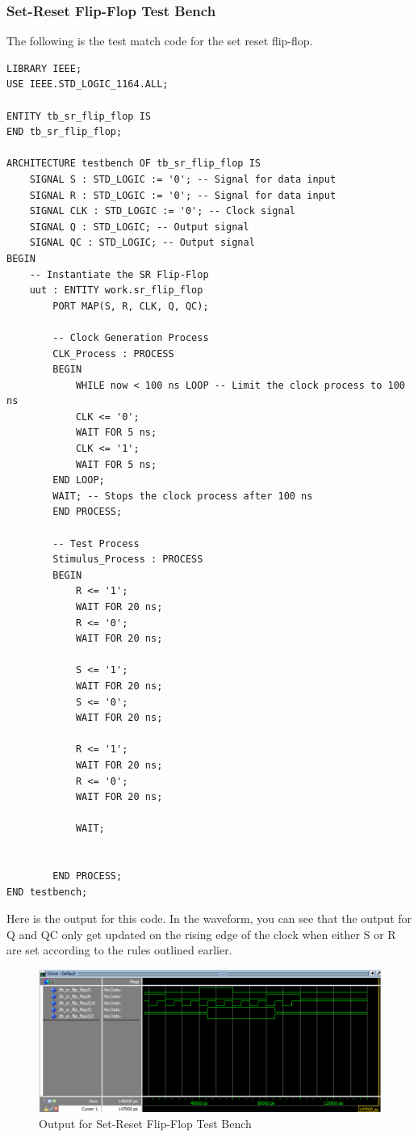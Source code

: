 \documentclass[12pt]{article}
\begin{document}
\subsubsection{Set-Reset Flip-Flop Test Bench}
The following is the test match code for the set reset flip-flop.
\begin{verbatim}
LIBRARY IEEE;
USE IEEE.STD_LOGIC_1164.ALL;

ENTITY tb_sr_flip_flop IS
END tb_sr_flip_flop;

ARCHITECTURE testbench OF tb_sr_flip_flop IS
    SIGNAL S : STD_LOGIC := '0'; -- Signal for data input
    SIGNAL R : STD_LOGIC := '0'; -- Signal for data input
    SIGNAL CLK : STD_LOGIC := '0'; -- Clock signal
    SIGNAL Q : STD_LOGIC; -- Output signal
    SIGNAL QC : STD_LOGIC; -- Output signal
BEGIN
    -- Instantiate the SR Flip-Flop
    uut : ENTITY work.sr_flip_flop
        PORT MAP(S, R, CLK, Q, QC);

        -- Clock Generation Process
        CLK_Process : PROCESS
        BEGIN
            WHILE now < 100 ns LOOP -- Limit the clock process to 100 ns
            CLK <= '0';
            WAIT FOR 5 ns;
            CLK <= '1';
            WAIT FOR 5 ns;
        END LOOP;
        WAIT; -- Stops the clock process after 100 ns
        END PROCESS;

        -- Test Process
        Stimulus_Process : PROCESS
        BEGIN
            R <= '1';
            WAIT FOR 20 ns;
            R <= '0';
            WAIT FOR 20 ns;

            S <= '1';
            WAIT FOR 20 ns;
            S <= '0';
            WAIT FOR 20 ns;

            R <= '1';
            WAIT FOR 20 ns;
            R <= '0';
            WAIT FOR 20 ns;

            WAIT;

    
        END PROCESS;
END testbench;
\end{verbatim}
\clearpage
Here is the output for this code. In the waveform, you can see that the output for Q and QC only get updated on the rising edge of the clock when either S or R are set according to the rules outlined earlier. \\
\begin{figure}[H]
\caption{Output for Set-Reset Flip-Flop Test Bench}
\centering
\includegraphics[width=\textwidth]{./diagrams/sr_flipflop.png}
\end{figure}
\end{document}
